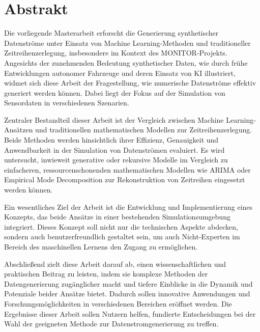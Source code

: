 \documentclass[
	11pt, 
	a4paper, 
	twoside, 
	openright, 
	titlepage=firstiscover, 
	numbers=noenddot, 
	BCOR=12mm,
	headsepline,
	footsepline, 
	toc=listof,
	toc=bibliography
	]{scrbook}
\begin{document}





\cleardoublepage
{}

\chapter*{Abstrakt}

Die vorliegende Masterarbeit erforscht die Generierung synthetischer Datenströme unter Einsatz von Machine Learning-Methoden und traditioneller Zeitreihenzerlegung, 
insbesondere im Kontext des MONITOR-Projekts. Angesichts der zunehmenden Bedeutung synthetischer Daten, wie durch frühe Entwicklungen autonomer Fahrzeuge und deren Einsatz 
von KI illustriert, widmet sich diese Arbeit der Fragestellung, wie numerische Datenströme effektiv generiert werden können. Dabei liegt der Fokus auf der Simulation von Sensordaten in verschiedenen Szenarien.

Zentraler Bestandteil dieser Arbeit ist der Vergleich zwischen Machine Learning-Ansätzen und traditionellen mathematischen Modellen zur Zeitreihenzerlegung. 
Beide Methoden werden hinsichtlich ihrer Effizienz, Genauigkeit und Anwendbarkeit in der Simulation von Datenströmen evaluiert. Es wird untersucht, inwieweit generative oder rekursive 
Modelle im Vergleich zu einfacheren, ressourcenschonenden mathematischen Modellen wie ARIMA oder Empirical Mode Decomposition zur Rekonstruktion von Zeitreihen eingesetzt werden können.

Ein wesentliches Ziel der Arbeit ist die Entwicklung und Implementierung eines Konzepts, das beide Ansätze in einer bestehenden Simulationsumgebung integriert. Dieses Konzept soll nicht nur die 
technischen Aspekte abdecken, sondern auch benutzerfreundlich gestaltet sein, um auch Nicht-Experten im Bereich des maschinellen Lernens den Zugang zu ermöglichen.

Abschließend zielt diese Arbeit darauf ab, einen wissenschaftlichen und praktischen Beitrag zu leisten, indem sie komplexe Methoden der Datengenerierung zugänglicher macht und tiefere Einblicke 
in die Dynamik und Potenziale beider Ansätze bietet. Dadurch sollen innovative Anwendungen und Forschungsmöglichkeiten in verschiedenen Bereichen eröffnet werden. Die Ergebnisse dieser Arbeit sollen Nutzern helfen, 
fundierte Entscheidungen bei der Wahl der geeigneten Methode zur Datenstromgenerierung zu treffen.
\end{document}
